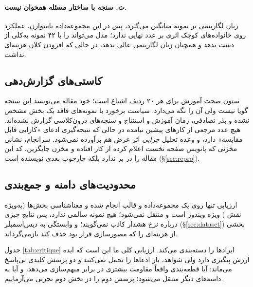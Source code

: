 \paragraph{ث. سنجه با ساختار مسئله همخوان نیست.}
زیان لگاریتمی بر نمونه میانگین می‌گیرد، پس در این مجموعه‌داده نامتوازن، عملکرد روی خانواده‌های کوچک اثری بر عدد نهایی ندارد؛ مدل می‌تواند  را با \num{۴۲} نمونه به‌کلی از دست بدهد و همچنان زیان لگاریتمی عالی بدهد، در حالی که افزودن  کلان هزینه‌ای نداشت.

\subsection{کاستی‌های گزارش‌دهی}
ستون صحت آموزش برای هر ۲۰ ردیف اشباع است؛ خود مقاله می‌نویسد این سنجه گویا نیست ولی آن را نگه می‌دارد. سیاست برخورد با نمونه‌های فاقد یک بخش مشخص نشده و بذر تصادفی، زمان آموزش و استنتاج و سنجه‌های درون‌کلاسی گزارش نشده‌اند. هیچ عدد مرجعی از کارهای پیشین نیامده در حالی که نتیجه‌گیری ادعای «کارایی قابل مقایسه» دارد، و وعده تحلیل \emph{چرایی} اثر عرض هم برآورده نمی‌شود. سرانجام، نشانی مخزنی که پانویس صفحه نخست اعلام کرده از کار افتاده و مخزن جایگزین، کد این مقاله را در بر ندارد بلکه چارچوب بعدی نویسنده است (\S\ref{sec:repro}).

\subsection{محدودیت‌های دامنه و جمع‌بندی}
ارزیابی تنها روی یک مجموعه‌داده و قالب  انجام شده و معناشناسی بخش‌ها (به‌ویژه نقش ) ویژه ویندوز است و منتقل نمی‌شود؛  هیچ نمونه سالمی ندارد، پس نتایج چیزی درباره نرخ هشدار کاذب نمی‌گویند؛ و وابستگی به دیس‌اسمبلر (\S\ref{sec:dataset}) بخشی از هزینه‌ای را که مصورسازی قرار بود حذف کند بازمی‌گرداند.

جدول \ref{tab:critique} ایراد‌ها را دسته‌بندی می‌کند. ارزیابی کلی ما این است که ایده ارزش پیگیری دارد ولی شواهد، بار ادعا‌ها را تحمل نمی‌کنند و دو پرسش کلیدی بی‌پاسخ می‌ماند: آیا قطعه‌بندی واقعاً مقاومت بیشتری در برابر مبهم‌سازی می‌دهد، و آیا به دامنه‌های دیگر منتقل می‌شود؛ پرسش دوم را در بخش دوم تجربی می‌آزماییم.
